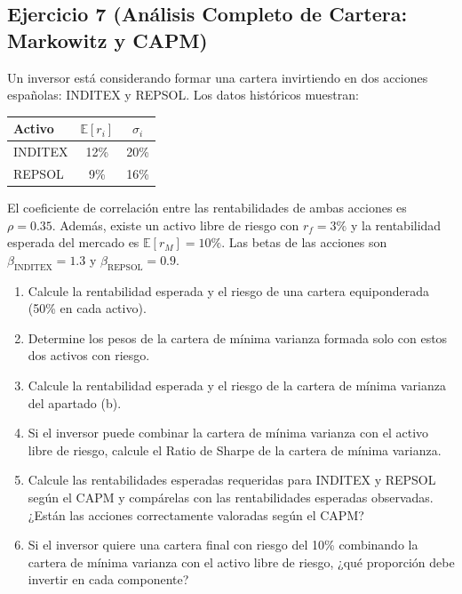 \documentclass[12pt,a4paper]{article}
\newcommand{\E}{\mathbb{E}}
\newenvironment{ejercicio}[1]{\subsection*{Ejercicio #1}}{}
\begin{document}
\begin{ejercicio}{7 (Análisis Completo de Cartera: Markowitz y CAPM)}
Un inversor está considerando formar una cartera invirtiendo en dos acciones españolas: INDITEX y REPSOL. Los datos históricos muestran:
\begin{center}
\begin{tabular}{lcc}
\toprule
Activo & $\E[r_i]$ & $\sigma_i$ \\
\midrule
INDITEX & 12\% & 20\% \\
REPSOL & 9\% & 16\% \\
\bottomrule
\end{tabular}
\end{center}

El coeficiente de correlación entre las rentabilidades de ambas acciones es $\rho = 0.35$. Además, existe un activo libre de riesgo con $r_f = 3\%$ y la rentabilidad esperada del mercado es $\E[r_M] = 10\%$. Las betas de las acciones son $\beta_{\text{INDITEX}} = 1.3$ y $\beta_{\text{REPSOL}} = 0.9$.

\begin{enumerate}[label=\alph*)]
  \item Calcule la rentabilidad esperada y el riesgo de una cartera equiponderada (50\% en cada activo).
  \item Determine los pesos de la cartera de mínima varianza formada solo con estos dos activos con riesgo.
  \item Calcule la rentabilidad esperada y el riesgo de la cartera de mínima varianza del apartado (b).
  \item Si el inversor puede combinar la cartera de mínima varianza con el activo libre de riesgo, calcule el Ratio de Sharpe de la cartera de mínima varianza.
  \item Calcule las rentabilidades esperadas requeridas para INDITEX y REPSOL según el CAPM y compárelas con las rentabilidades esperadas observadas. ¿Están las acciones correctamente valoradas según el CAPM?
  \item Si el inversor quiere una cartera final con riesgo del 10\% combinando la cartera de mínima varianza con el activo libre de riesgo, ¿qué proporción debe invertir en cada componente?
\end{enumerate}
\end{ejercicio}
\end{document}
